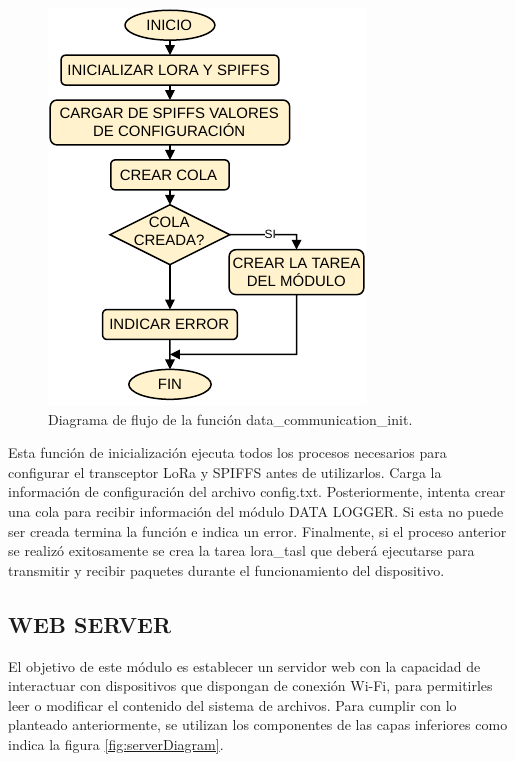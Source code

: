 \begin{figure}[h]
	\centering
	\includegraphics[scale=1]{./Figures/lora_communication_init.pdf}
	\caption{Diagrama de flujo de la función data\_communication\_init.}
		\label{fig:loraInit}
\end{figure}

Esta función de inicialización ejecuta todos los procesos necesarios para configurar el transceptor LoRa y SPIFFS antes de utilizarlos. Carga la información de configuración del archivo config.txt. Posteriormente, intenta crear una cola para recibir información del módulo DATA LOGGER. Si esta no puede ser creada termina la función e indica un error. Finalmente, si el proceso anterior se realizó exitosamente se crea la tarea lora\_tasl que deberá ejecutarse para transmitir y recibir paquetes durante el funcionamiento del dispositivo. 

\subsection{WEB SERVER}

El objetivo de este módulo es establecer un servidor web con la capacidad de interactuar con dispositivos que dispongan de conexión Wi-Fi, para permitirles leer o modificar el contenido del sistema de archivos. Para cumplir con lo planteado anteriormente, se utilizan los componentes de las capas inferiores como indica la figura \ref{fig:serverDiagram}.

